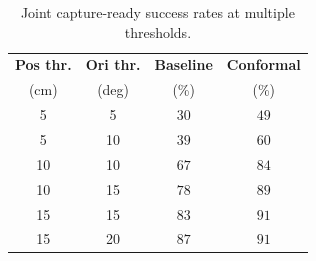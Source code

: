 \begin{table}[t]
\centering
\caption{Joint capture-ready success rates at multiple thresholds.}
\label{tab:thresholds}
\begin{tabular}{ccc c}
\toprule
\textbf{Pos thr.} & \textbf{Ori thr.} & \textbf{Baseline} & \textbf{Conformal} \\
 (cm) & (deg) & (\%) & (\%) \\
\midrule
5 & 5 & $30$ & $49$ \\
5 & 10 & $39$ & $60$ \\
10 & 10 & $67$ & $84$ \\
10 & 15 & $78$ & $89$ \\
15 & 15 & $83$ & $91$ \\
15 & 20 & $87$ & $91$ \\
\bottomrule
\end{tabular}
\end{table}